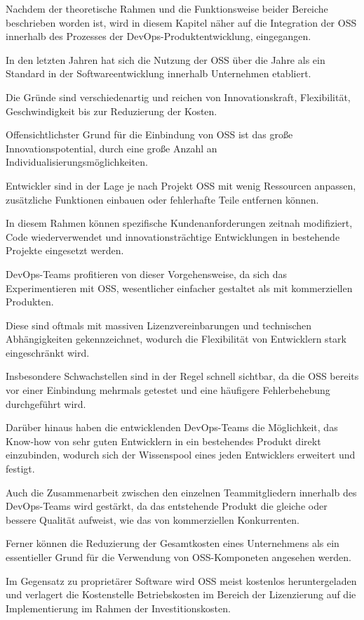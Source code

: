 Nachdem der theoretische Rahmen und die Funktionsweise beider Bereiche beschrieben worden ist, wird in diesem Kapitel näher auf die Integration der OSS innerhalb des Prozesses der DevOps-Produktentwicklung, eingegangen.

In den letzten Jahren hat sich die Nutzung der OSS über die Jahre als ein Standard in der Softwareentwicklung innerhalb Unternehmen etabliert. 

Die Gründe sind verschiedenartig und reichen von Innovationskraft, Flexibilität, Geschwindigkeit bis zur Reduzierung der Kosten.

Offensichtlichster Grund für die Einbindung von OSS ist das große Innovationspotential, durch eine große Anzahl an Individualisierungsmöglichkeiten. 

Entwickler sind in der Lage je nach Projekt OSS mit wenig Ressourcen anpassen, zusätzliche Funktionen einbauen oder fehlerhafte Teile entfernen können. 

In diesem Rahmen können spezifische Kundenanforderungen zeitnah modifiziert, Code wiederverwendet und innovationsträchtige Entwicklungen in bestehende Projekte eingesetzt werden.

DevOps-Teams profitieren von dieser Vorgehensweise, da sich das Experimentieren mit OSS, wesentlicher einfacher gestaltet als mit kommerziellen Produkten.   

Diese sind oftmals mit massiven Lizenzvereinbarungen und technischen Abhängigkeiten gekennzeichnet, wodurch die Flexibilität von Entwicklern stark eingeschränkt wird. 

Insbesondere Schwachstellen sind in der Regel schnell sichtbar, da die OSS bereits vor einer Einbindung mehrmals getestet und eine häufigere Fehlerbehebung durchgeführt wird.

Darüber hinaus haben die entwicklenden DevOps-Teams die Möglichkeit, das Know-how von sehr guten Entwicklern in ein bestehendes Produkt direkt einzubinden, wodurch sich der Wissenspool eines jeden Entwicklers erweitert und festigt. 

Auch die Zusammenarbeit zwischen den einzelnen Teammitgliedern innerhalb des DevOps-Teams wird gestärkt, da das entstehende Produkt die gleiche oder bessere Qualität aufweist, wie das von kommerziellen Konkurrenten. 

Ferner können die Reduzierung der Gesamtkosten eines Unternehmens als ein essentieller Grund für die Verwendung von OSS-Komponeten angesehen werden. 

Im Gegensatz zu proprietärer Software wird OSS meist kostenlos heruntergeladen und verlagert die Kostenstelle Betriebskosten im Bereich der Lizenzierung auf die Implementierung im Rahmen der Investitionskosten. \cite{augsten_10_2019} 

